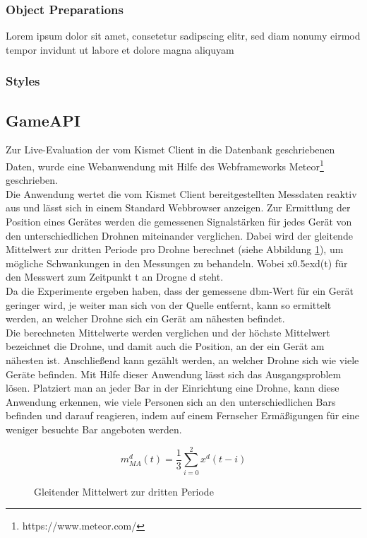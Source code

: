 \documentclass[a4paper]{spie}  %
\begin{document}
\subsubsection{Object Preparations}
Lorem ipsum dolor sit amet, consetetur sadipscing elitr, sed diam nonumy eirmod tempor invidunt ut labore et dolore magna aliquyam
\subsubsection{Styles}


\subsection{GameAPI}
Zur Live-Evaluation der vom Kismet Client in die Datenbank geschriebenen Daten, wurde eine Webanwendung mit Hilfe des Webframeworks Meteor\footnote{https://www.meteor.com/} geschrieben. \\
Die Anwendung wertet die vom Kismet Client bereitgestellten Messdaten reaktiv aus und lässt sich in einem Standard Webbrowser anzeigen.
Zur Ermittlung der Position eines Gerätes werden die gemessenen Signalstärken für jedes Gerät von den unterschiedlichen Drohnen miteinander verglichen. Dabei wird der gleitende Mittelwert zur dritten Periode pro Drohne berechnet (siehe Abbildung \ref{eqn:middle}), um mögliche Schwankungen in den Messungen zu behandeln. Wobei x\raise0.5ex\hbox{d}(t) für den Messwert zum Zeitpunkt t an Drogne d steht.
\\Da die Experimente ergeben haben, dass der gemessene dbm-Wert für ein Gerät geringer wird, je weiter man sich von der Quelle entfernt, kann so ermittelt werden, an welcher Drohne sich ein Gerät am nähesten befindet. \\
Die berechneten Mittelwerte werden verglichen und der höchste Mittelwert bezeichnet die Drohne, und damit auch die Position, an der ein Gerät am nähesten ist. Anschließend kann gezählt werden, an welcher Drohne sich wie viele Geräte befinden. Mit Hilfe dieser Anwendung lässt sich das Ausgangsproblem lösen. Platziert man an jeder Bar in der Einrichtung eine Drohne, kann diese Anwendung erkennen, wie viele Personen sich an den unterschiedlichen Bars befinden und darauf reagieren, indem auf einem Fernseher Ermäßigungen für eine weniger besuchte Bar angeboten werden.
\begin{figure}
\begin{equation}
  \boxed{{ m }_{ MA }^{ d }(t) = \frac { 1 }{ 3 } \sum _{ i=0 }^{ 2 }{ { x }^{ d }(t-i) }}
\end{equation}
\caption{Gleitender Mittelwert zur dritten Periode}
\label{eqn:middle}
\end{figure}
\end{document}

